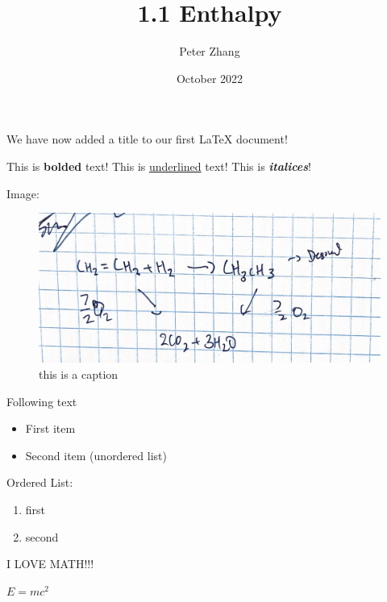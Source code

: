 \documentclass[12pt, letterpaper]{article}
\title{1.1 Enthalpy}
\author{Peter Zhang}
\date{October 2022}
\begin{document}
\maketitle
We have now added a title to our first \LaTeX{} document!

This is \textbf{bolded} text!
This is \underline{underlined} text!
This is \textbf{\textit{italices}}!


Image:

\begin{figure}[h]
	\centering
	\includegraphics[width=\textwidth]{images/1.2fig1.jpg}
\caption{this is a caption}
\label{fig:image}	
\end{figure}	

Following text

\begin{itemize}
\item First item
\item Second item (unordered list)
\end{itemize}


Ordered List:

\begin{enumerate}
\item first
\item second
\end{enumerate}

\maketitle
I LOVE MATH!!!

$E = mc^2$
\end{document}

